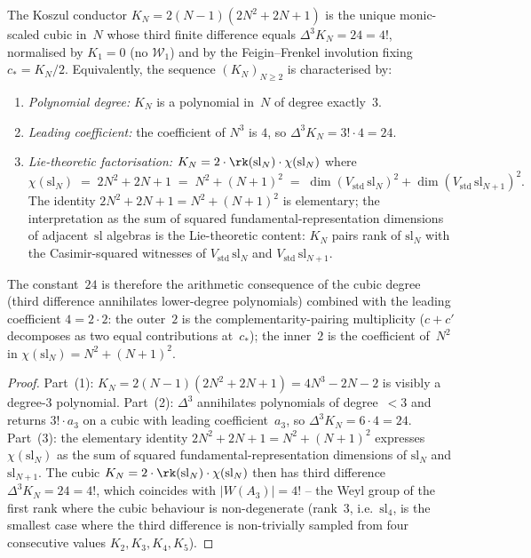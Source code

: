 \begin{theorem}
\label{thm:koszul-conductor-cubic-rigidity}
The Koszul conductor $K_N = 2(N-1)(2N^2+2N+1)$ is the unique
monic-scaled cubic in~$N$ whose third finite difference equals
$\Delta^3 K_N = 24 = 4!$, normalised by $K_1 = 0$ (no $\mathcal{W}_1$)
and by the Feigin--Frenkel involution fixing $c_* = K_N/2$.
Equivalently, the sequence $(K_N)_{N \ge 2}$
is characterised by:
\begin{enumerate}
\item \emph{Polynomial degree:} $K_N$ is a polynomial in~$N$ of
degree exactly~$3$.
\item \emph{Leading coefficient:} the coefficient of $N^3$ is $4$,
so $\Delta^3 K_N = 3! \cdot 4 = 24$.
\item \emph{Lie-theoretic factorisation:}
$K_N = 2 \cdot \rk(\mathrm{sl}_N) \cdot \chi(\mathrm{sl}_N)$ where
\[
\chi(\mathrm{sl}_N) \;=\; 2N^2 + 2N + 1
\;=\; N^2 + (N+1)^2
\;=\; \dim(V_{\mathrm{std}}\, \mathrm{sl}_N)^2
 + \dim(V_{\mathrm{std}}\, \mathrm{sl}_{N+1})^2.
\]
The identity $2N^2+2N+1 = N^2+(N+1)^2$ is elementary; the
interpretation as the sum of squared fundamental-representation
dimensions of adjacent~$\mathrm{sl}$ algebras is the Lie-theoretic
content: $K_N$ pairs rank of $\mathrm{sl}_N$ with the Casimir-squared
witnesses of $V_{\mathrm{std}}\,\mathrm{sl}_N$ and
$V_{\mathrm{std}}\,\mathrm{sl}_{N+1}$.
\end{enumerate}
The constant~$24$ is therefore the arithmetic consequence of the
cubic degree (third difference annihilates lower-degree polynomials)
combined with the leading coefficient $4 = 2 \cdot 2$: the outer~$2$
is the complementarity-pairing multiplicity ($c + c'$ decomposes as
two equal contributions at~$c_*$); the inner~$2$ is the coefficient
of~$N^2$ in $\chi(\mathrm{sl}_N) = N^2 + (N+1)^2$.
\end{theorem}

\begin{proof}
Part~(1): $K_N = 2(N-1)(2N^2+2N+1) = 4N^3 - 2N - 2$ is visibly a
degree-$3$ polynomial. Part~(2): $\Delta^3$ annihilates polynomials
of degree~$<3$ and returns $3! \cdot a_3$ on a cubic with leading
coefficient~$a_3$, so $\Delta^3 K_N = 6 \cdot 4 = 24$. Part~(3): the
elementary identity $2N^2+2N+1 = N^2+(N+1)^2$ expresses
$\chi(\mathrm{sl}_N)$ as the sum of squared fundamental-representation
dimensions of $\mathrm{sl}_N$ and $\mathrm{sl}_{N+1}$. The cubic
$K_N = 2 \cdot \rk(\mathrm{sl}_N) \cdot \chi(\mathrm{sl}_N)$ then has
third difference $\Delta^3 K_N = 24 = 4!$,
which coincides with $|W(A_3)| = 4!$ -- the Weyl group of the first
rank where the cubic behaviour is non-degenerate (rank~$3$,
i.e.~$\mathrm{sl}_4$, is the smallest case where the third
difference is non-trivially sampled from four consecutive values
$K_2, K_3, K_4, K_5$).
\end{proof}

